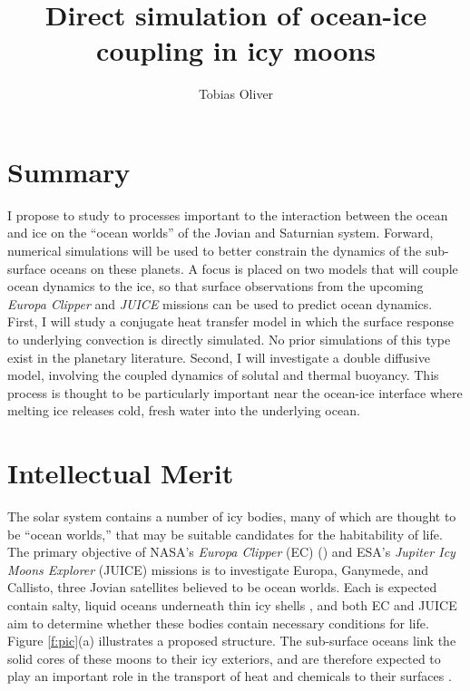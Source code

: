 \documentclass{article}
\title{Direct simulation of ocean-ice coupling in icy moons}
\author{Tobias Oliver}
\date{}
\begin{document}
\newcommand{\citep}[1]{\cite{#1}}
\maketitle
\section{Summary}
I propose to study to processes important to the interaction between the ocean and ice on the ``ocean worlds'' of the Jovian and Saturnian system. Forward, numerical simulations will be used to better constrain the dynamics of the sub-surface oceans on these planets. A focus is placed on two models that will couple ocean dynamics to the ice, so that surface observations from the upcoming \textit{Europa Clipper} and \textit{JUICE} missions can be used to predict ocean dynamics.
First, I will study a conjugate heat transfer model in which the surface response to underlying convection is directly simulated. No prior simulations of this type exist in the planetary literature. Second, I will investigate a double diffusive model, involving the coupled dynamics of solutal and thermal buoyancy. This process is thought to be particularly important near the ocean-ice interface where melting ice releases cold, fresh water into the underlying ocean.
\section{Intellectual Merit}
The solar system contains a number of icy bodies, many of which are thought to be ``ocean worlds,'' that may be suitable candidates for the habitability of life.
The primary objective of NASA's \textit{Europa Clipper} (EC) (\cite{pC14_JUICE}) and ESA's \textit{Jupiter Icy Moons Explorer} (JUICE)\citep{oG13} missions is to investigate Europa, Ganymede, and Callisto, three Jovian satellites believed to be ocean worlds. Each is expected contain salty, liquid oceans underneath thin icy shells \citep{rP99,fN16}, and both EC and JUICE aim to determine whether these bodies contain necessary conditions for life\citep{tB24}. Figure \ref{f:pic}(a) illustrates a proposed structure.
The sub-surface oceans link the solid cores of these moons to their icy exteriors, and are therefore expected to play an important role in the transport of heat and chemicals to their surfaces \citep{kS20}. 
\end{document}
